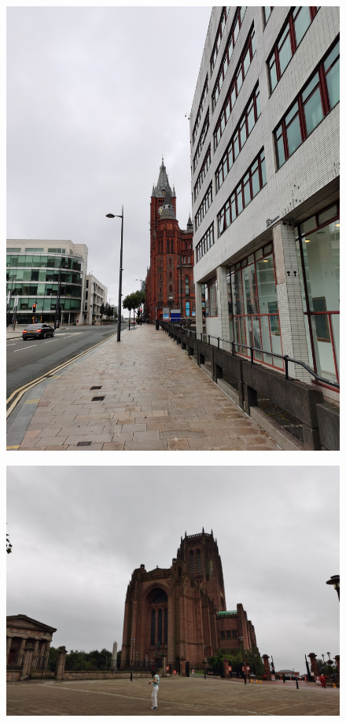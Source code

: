 \documentclass[11pt]{article}
\begin{document}
\begin{figure}[H]
    \centering
    \includegraphics[width=\textwidth]{1G.jpg}
\end{figure}

\begin{figure}[H]
    \centering
    \includegraphics[width=\textwidth]{1H.jpg}
\end{figure}
\end{document}
